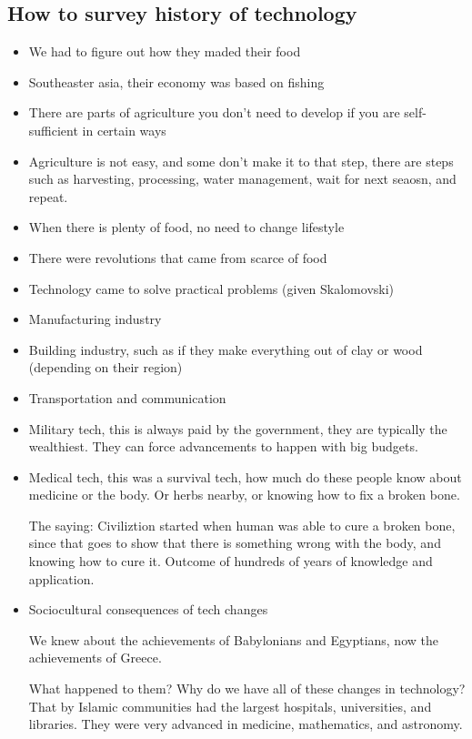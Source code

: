 \documentclass{article}
\begin{document}
\subsection{How to survey history of technology}
\begin{itemize}
  \item We had to figure out how they maded their food
  \item Southeaster asia, their economy was based on fishing
  \item There are parts of agriculture you don't need to develop
    if you are self-sufficient in certain ways
  \item Agriculture is not easy, and some don't make it to that step,
    there are steps such as harvesting, processing, water management,
    wait for next seaosn, and repeat.
  \item When there is plenty of food, no need to change lifestyle
  \item There were revolutions that came from scarce of food
  \item Technology came to solve practical problems (given Skalomovski)
  \item Manufacturing industry
  \item Building industry,
    such as if they make everything out of clay or wood (depending on their region)
  \item Transportation and communication
  \item Military tech, this is always paid by the government,
    they are typically the wealthiest. They can
    force advancements to happen with big budgets.
  \item Medical tech, this was a survival tech,
    how much do these people know about medicine or the body.
    Or herbs nearby,
    or knowing how to fix a broken bone.

    The saying: Civiliztion started when human was able to cure a broken bone,
    since that goes to show that there is something wrong with the body,
    and knowing how to cure it. Outcome of hundreds of years of knowledge and application.
  \item Sociocultural consequences of tech changes

    We knew about the achievements of Babylonians and Egyptians,
    now the achievements of Greece.

    What happened to them? Why do we have all of these changes in technology?
    That by Islamic communities had the largest hospitals, universities, and libraries.
    They were very advanced in medicine, mathematics, and astronomy.


\end{itemize}
\end{document}
